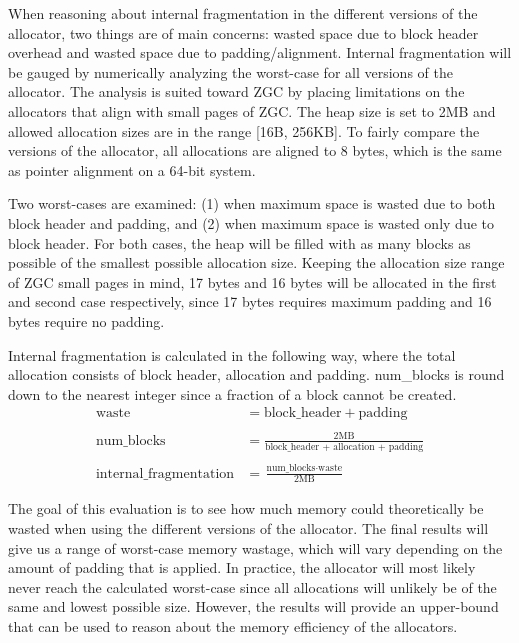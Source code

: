 When reasoning about internal fragmentation in the different versions of the allocator, two things are of main concerns: wasted space due to block header overhead and wasted space due to padding/alignment. Internal fragmentation will be gauged by numerically analyzing the worst-case for all versions of the allocator. The analysis is suited toward ZGC by placing limitations on the allocators that align with small pages of ZGC. The heap size is set to 2MB and allowed allocation sizes are in the range [16B, 256KB]. To fairly compare the versions of the allocator, all allocations are aligned to 8 bytes, which is the same as pointer alignment on a 64-bit system.

Two worst-cases are examined: (1) when maximum space is wasted due to both block header and padding, and (2) when maximum space is wasted only due to block header. For both cases, the heap will be filled with as many blocks as possible of the smallest possible allocation size. Keeping the allocation size range of ZGC small pages in mind, 17 bytes and 16 bytes will be allocated in the first and second case respectively, since 17 bytes requires maximum padding and 16 bytes require no padding.

Internal fragmentation is calculated in the following way, where the total allocation consists of block header, allocation and padding. num\_blocks is round down to the nearest integer since a fraction of a block cannot be created.
\begin{align*}
    \text{waste} &= \text{block\_header} + \text{padding} \\\\
    \text{num\_blocks} &= \frac{2\text{MB}}{\text{block\_header + allocation + padding}} \\\\
    \text{internal\_fragmentation} &= \frac{\text{num\_blocks} \cdot \text{waste}}{2\text{MB}}
\end{align*}

The goal of this evaluation is to see how much memory could theoretically be wasted when using the different versions of the allocator. The final results will give us a range of worst-case memory wastage, which will vary depending on the amount of padding that is applied. In practice, the allocator will most likely never reach the calculated worst-case since all allocations will unlikely be of the same and lowest possible size. However, the results will provide an upper-bound that can be used to reason about the memory efficiency of the allocators.


